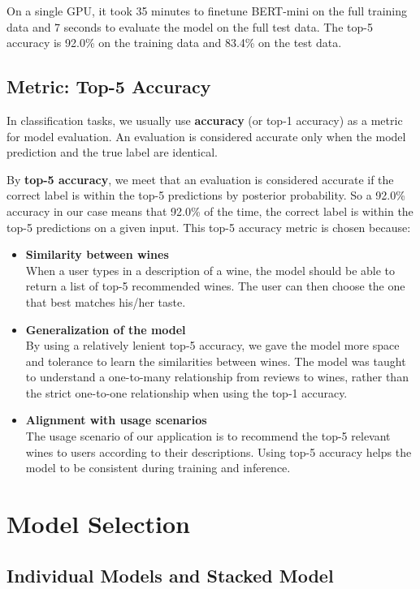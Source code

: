\documentclass[
	a4paper,
	fontsize=10pt, %
	twoside=false, %
	secnumdepth=2, %
]{kaohandt}
\begin{document}
On a single GPU, it took 35 minutes to finetune BERT-mini on the full training data and 7 seconds to evaluate the model on the full test data. The top-5 accuracy is 92.0\% on the training data and 83.4\% on the test data.

\subsection{Metric: Top-5 Accuracy}

In classification tasks, we usually use \textbf{accuracy} (or top-1 accuracy) as a metric for model evaluation. An evaluation is considered accurate only when the model prediction and the true label are identical.

By \textbf{top-5 accuracy}, we meet that an evaluation is considered accurate if the correct label is within the top-5 predictions by posterior probability. So a 92.0\% accuracy in our case means that 92.0\% of the time, the correct label is within the top-5 predictions on a given input. This top-5 accuracy metric is chosen because:

\begin{itemize}
	\item \textbf{Similarity between wines} \\
	When a user types in a description of a wine, the model should be able to return a list of top-5 recommended wines. The user can then choose the one that best matches his/her taste.
	\item \textbf{Generalization of the model} \\
	By using a relatively lenient top-5 accuracy, we gave the model more space and tolerance to learn the similarities between wines. The model was taught to understand a one-to-many relationship from reviews to wines, rather than the strict one-to-one relationship when using the top-1 accuracy.
	\item \textbf{Alignment with usage scenarios} \\
	The usage scenario of our application is to recommend the top-5 relevant wines to users according to their descriptions. Using top-5 accuracy helps the model to be consistent during training and inference.
\end{itemize}

\section{Model Selection}

\subsection{Individual Models and Stacked Model}
\end{document}
